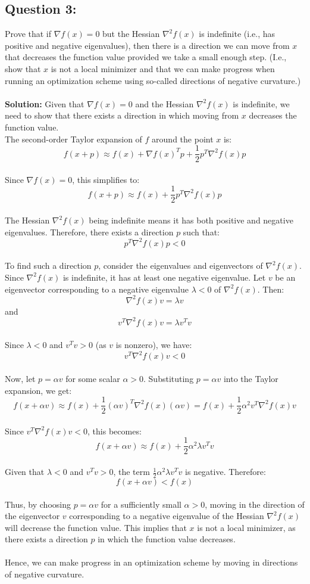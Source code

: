 \documentclass[11pt,onecolumn]{article}
\begin{document}
\subsection*{Question 3:}
Prove that if $\nabla f(x) = 0$ but the Hessian $\nabla^2f(x)$ is indefinite (i.e., has positive and negative eigenvalues), then there is a direction we can move from $x$ that decreases the function value provided we take a small enough step. (I.e., show that $x$ is not a local minimizer and that we can make progress when running an optimization scheme using so-called directions of negative curvature.)
\\
\vspace{1pt}
\\
\textbf{Solution:}
Given that \(\nabla f(x) = 0\) and the Hessian \(\nabla^2 f(x)\) is indefinite, we need to show that there exists a direction in which moving from \(x\) decreases the function value.
\\
The second-order Taylor expansion of \(f\) around the point \(x\) is:
\[
f(x + p) \approx f(x) + \nabla f(x)^T p + \frac{1}{2} p^T \nabla^2 f(x) p
\]
\\
Since \(\nabla f(x) = 0\), this simplifies to:
\[
f(x + p) \approx f(x) + \frac{1}{2} p^T \nabla^2 f(x) p
\]
\\
The Hessian \(\nabla^2 f(x)\) being indefinite means it has both positive and negative eigenvalues. Therefore, there exists a direction \(p\) such that:
\[
p^T \nabla^2 f(x) p < 0
\]
\\
To find such a direction \(p\), consider the eigenvalues and eigenvectors of \(\nabla^2 f(x)\). Since \(\nabla^2 f(x)\) is indefinite, it has at least one negative eigenvalue. Let \(v\) be an eigenvector corresponding to a negative eigenvalue \(\lambda < 0\) of \(\nabla^2 f(x)\). Then:
\[
\nabla^2 f(x) v = \lambda v
\]
and
\[
v^T \nabla^2 f(x) v = \lambda v^T v
\]
\\
Since \(\lambda < 0\) and \(v^T v > 0\) (as \(v\) is nonzero), we have:
\[
v^T \nabla^2 f(x) v < 0
\]
\\
Now, let \(p = \alpha v\) for some scalar \(\alpha > 0\). Substituting \(p = \alpha v\) into the Taylor expansion, we get:
\[
f(x + \alpha v) \approx f(x) + \frac{1}{2} (\alpha v)^T \nabla^2 f(x) (\alpha v) = f(x) + \frac{1}{2} \alpha^2 v^T \nabla^2 f(x) v
\]
\\
Since \(v^T \nabla^2 f(x) v < 0\), this becomes:
\[
f(x + \alpha v) \approx f(x) + \frac{1}{2} \alpha^2 \lambda v^T v
\]
\\
Given that \(\lambda < 0\) and \(v^T v > 0\), the term \(\frac{1}{2} \alpha^2 \lambda v^T v\) is negative. Therefore:
\[
f(x + \alpha v) < f(x)
\]
\\
Thus, by choosing \(p = \alpha v\) for a sufficiently small \(\alpha > 0\), moving in the direction of the eigenvector \(v\) corresponding to a negative eigenvalue of the Hessian \(\nabla^2 f(x)\) will decrease the function value. This implies that \(x\) is not a local minimizer, as there exists a direction \(p\) in which the function value decreases.
\\
\vspace{0pt}
\\
Hence, we can make progress in an optimization scheme by moving in directions of negative curvature.
\end{document}
